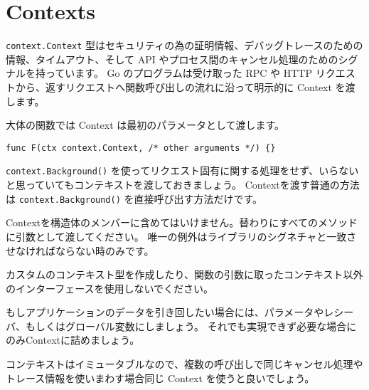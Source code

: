 \section{Contexts}

\texttt{context.Context} 型はセキュリティの為の証明情報、デバッグトレースのための情報、タイムアウト、そして API やプロセス間のキャンセル処理のためのシグナルを持っています。 Go のプログラムは受け取った RPC や HTTP リクエストから、返すリクエストへ関数呼び出しの流れに沿って明示的に Context を渡します。

大体の関数では Context は最初のパラメータとして渡します。

\begin{lstlisting}[]
func F(ctx context.Context, /* other arguments */) {}
\end{lstlisting}

\texttt{context.Background()} を使ってリクエスト固有に関する処理をせず、いらないと思っていてもコンテキストを渡しておきましょう。 Contextを渡す普通の方法は \texttt{context.Background()} を直接呼び出す方法だけです。

Contextを構造体のメンバーに含めてはいけません。替わりにすべてのメソッドに引数として渡してください。 唯一の例外はライブラリのシグネチャと一致させなければならない時のみです。

カスタムのコンテキスト型を作成したり、関数の引数に取ったコンテキスト以外のインターフェースを使用しないでください。

もしアプリケーションのデータを引き回したい場合には、パラメータやレシーバ、もしくはグローバル変数にしましょう。 それでも実現できず必要な場合にのみContextに詰めましょう。

コンテキストはイミュータブルなので、複数の呼び出しで同じキャンセル処理やトレース情報を使いまわす場合同じ Context を使うと良いでしょう。

